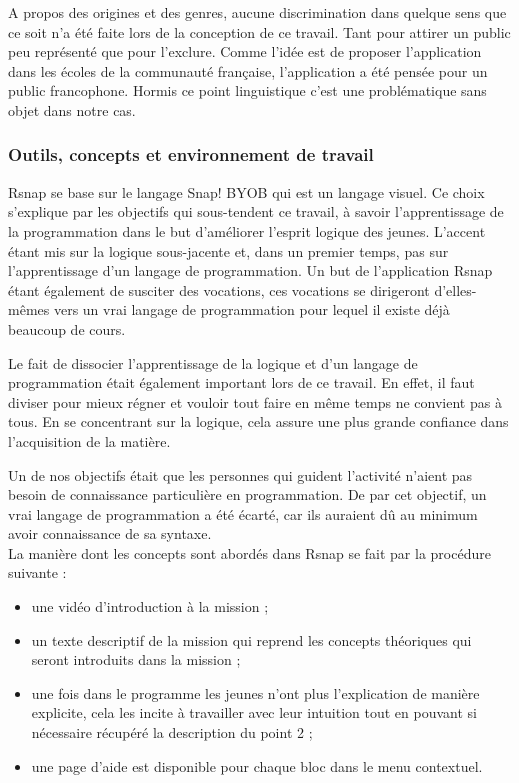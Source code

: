 A propos des origines et des genres, aucune discrimination dans quelque sens que ce soit n'a été faite lors de la conception de ce travail. Tant pour attirer un public peu représenté que pour l'exclure. Comme l'idée est de proposer l'application dans les écoles de la communauté française, l'application a été pensée pour un public francophone. Hormis ce point linguistique c'est une problématique sans objet dans notre cas.

\subsubsection{Outils, concepts et environnement de travail} 
Rsnap se base sur le langage Snap! BYOB qui est un langage visuel. Ce choix s'explique par les objectifs qui sous-tendent ce travail, à savoir l'apprentissage de la programmation dans le but d'améliorer l'esprit logique des jeunes. L'accent étant mis sur la logique sous-jacente et, dans un premier temps, pas sur l'apprentissage d'un langage de programmation. Un but de l'application Rsnap étant également de susciter des vocations, ces vocations se dirigeront d'elles-mêmes vers un vrai langage de programmation pour lequel il existe déjà beaucoup de cours.

Le fait de dissocier l'apprentissage de la logique et d'un langage de programmation était également important lors de ce travail. En effet, il faut diviser pour mieux régner et vouloir tout faire en même temps ne convient pas à tous. En se concentrant sur la logique, cela assure une plus grande confiance dans l'acquisition de la matière.

Un de nos objectifs était que les personnes qui guident l'activité n'aient pas besoin de connaissance particulière en programmation. De par cet objectif, un vrai langage de programmation a été écarté, car ils auraient dû au minimum avoir connaissance de sa syntaxe.\\

La manière dont les concepts sont abordés dans Rsnap se fait par la procédure suivante :
\begin{itemize}
	\item une vidéo d'introduction à la mission ;
	\item un texte descriptif de la mission qui reprend les concepts théoriques qui seront introduits dans la mission ;
	\item une fois dans le programme les jeunes n'ont plus l'explication de manière explicite, cela les incite à travailler avec leur intuition tout en pouvant si nécessaire récupéré la description du point 2 ;
	\item une page d'aide est disponible pour chaque bloc dans le menu contextuel.
\end{itemize}

